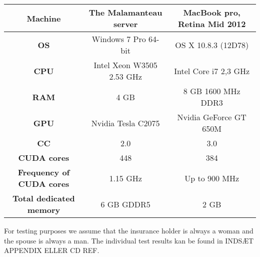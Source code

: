 \begin{center}
\begin{tabular}{|c|c|c|}
	\hline
	\multicolumn{1}{|m{2.8cm}|}{\centering \textbf{Machine}} & The Malamanteau server & MacBook pro, Retina Mid 2012 \\ \hline
	\multicolumn{1}{|m{2.8cm}|}{\centering \textbf{OS}} & Windows 7 Pro 64-bit & OS X 10.8.3 (12D78)\\ \hline
	\multicolumn{1}{|m{2.8cm}|}{\centering \textbf{CPU}} & Intel Xeon W3505 2.53 GHz & Intel Core i7 2,3 GHz \\ \hline
	\multicolumn{1}{|m{2.8cm}|}{\centering \textbf{RAM}} & 4 GB & 8 GB 1600 MHz DDR3\\ \hline
	\multicolumn{1}{|m{2.8cm}|}{\centering \textbf{GPU}} & Nvidia Tesla C2075\cite{tesl} & Nvidia GeForce GT 650M \cite{kepl}\\ \hline
	\multicolumn{1}{|m{2.8cm}|}{\centering \textbf{CC}} & 2.0 & 3.0\\ \hline
	\multicolumn{1}{|m{2.8cm}|}{\centering \textbf{CUDA cores}} & 448 & 384\\ \hline
	\multicolumn{1}{|m{2.8cm}|}{\centering \textbf{Frequency of CUDA cores}} & 1.15 GHz & Up to 900 MHz\\ \hline
	\multicolumn{1}{|m{2.8cm}|}{\centering \textbf{Total dedicated memory}} & 6 GB GDDR5 & 2 GB\\ \hline
\end{tabular}
\end{center}

For testing purposes we assume that the insurance holder is always a woman and the spouse is always a man. The individual test results kan be found in INDSÆT APPENDIX ELLER CD REF.

